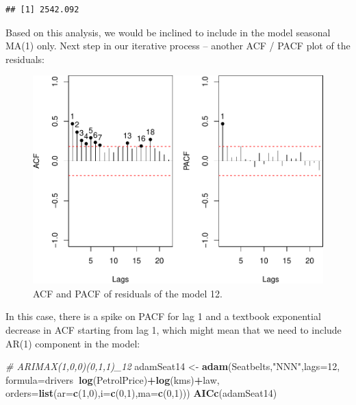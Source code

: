 \documentclass[]{book}
\newenvironment{Shaded}{\begin{snugshade}}{\end{snugshade}}
\newcommand{\CommentTok}[1]{\textcolor[rgb]{0.56,0.35,0.01}{\textit{#1}}}
\newcommand{\DataTypeTok}[1]{\textcolor[rgb]{0.13,0.29,0.53}{#1}}
\newcommand{\DecValTok}[1]{\textcolor[rgb]{0.00,0.00,0.81}{#1}}
\newcommand{\KeywordTok}[1]{\textcolor[rgb]{0.13,0.29,0.53}{\textbf{#1}}}
\newcommand{\NormalTok}[1]{#1}
\newcommand{\OperatorTok}[1]{\textcolor[rgb]{0.81,0.36,0.00}{\textbf{#1}}}
\newcommand{\StringTok}[1]{\textcolor[rgb]{0.31,0.60,0.02}{#1}}
\theoremstyle{definition}
\theoremstyle{definition}
\theoremstyle{definition}
\theoremstyle{definition}
\theoremstyle{remark}
\begin{document}
\begin{verbatim}
## [1] 2542.092
\end{verbatim}

Based on this analysis, we would be inclined to include in the model seasonal MA(1) only. Next step in our iterative process -- another ACF / PACF plot of the residuals:

\begin{figure}
\centering
\includegraphics{Svetunkov--2022----ADAM_files/figure-latex/adamSeat13ACFPACF-1.pdf}
\caption{\label{fig:adamSeat13ACFPACF}ACF and PACF of residuals of the model 12.}
\end{figure}

In this case, there is a spike on PACF for lag 1 and a textbook exponential decrease in ACF starting from lag 1, which might mean that we need to include AR(1) component in the model:

\begin{Shaded}
\begin{Highlighting}[]
\CommentTok{# ARIMAX(1,0,0)(0,1,1)_12}
\NormalTok{adamSeat14 <-}\StringTok{ }\KeywordTok{adam}\NormalTok{(Seatbelts,}\StringTok{"NNN"}\NormalTok{,}\DataTypeTok{lags=}\DecValTok{12}\NormalTok{,}
                   \DataTypeTok{formula=}\NormalTok{drivers}\OperatorTok{~}\KeywordTok{log}\NormalTok{(PetrolPrice)}\OperatorTok{+}\KeywordTok{log}\NormalTok{(kms)}\OperatorTok{+}\NormalTok{law,}
                   \DataTypeTok{orders=}\KeywordTok{list}\NormalTok{(}\DataTypeTok{ar=}\KeywordTok{c}\NormalTok{(}\DecValTok{1}\NormalTok{,}\DecValTok{0}\NormalTok{),}\DataTypeTok{i=}\KeywordTok{c}\NormalTok{(}\DecValTok{0}\NormalTok{,}\DecValTok{1}\NormalTok{),}\DataTypeTok{ma=}\KeywordTok{c}\NormalTok{(}\DecValTok{0}\NormalTok{,}\DecValTok{1}\NormalTok{)))}
\KeywordTok{AICc}\NormalTok{(adamSeat14)}
\end{Highlighting}
\end{Shaded}
\end{document}
